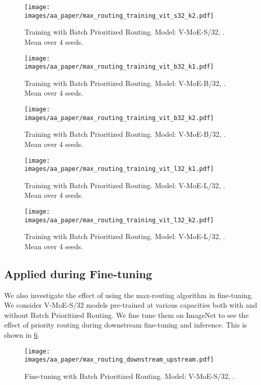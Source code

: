 \documentclass{article}
\newcommand{\abbv}{{V-MoE}}
\newcommand{\maxrouting}{Batch Prioritized Routing}
\begin{document}
\begin{figure}[h]
\centering
\texttt{[image: images/aa\_paper/max\_routing\_training\_vit\_s32\_k2.pdf]}
\caption{Training with \maxrouting{}. Model: \abbv{}-S/32, . Mean over 4 seeds.}
\label{im:training_max_routing_vit_s}
\end{figure}

\begin{figure}[h]
\centering
\texttt{[image: images/aa\_paper/max\_routing\_training\_vit\_b32\_k1.pdf]}
\caption{Training with \maxrouting{}. Model: \abbv{}-B/32, . Mean over 4 seeds.}
\label{im:training_max_routing_vit_b_k1}
\end{figure}


\begin{figure}[h]
\centering
\texttt{[image: images/aa\_paper/max\_routing\_training\_vit\_b32\_k2.pdf]}
\caption{Training with \maxrouting{}. Model: \abbv{}-B/32, . Mean over 4 seeds.}
\label{im:training_max_routing_vit_b}
\end{figure}


\begin{figure}[h]
\centering
\texttt{[image: images/aa\_paper/max\_routing\_training\_vit\_l32\_k1.pdf]}
\caption{Training with \maxrouting{}. Model: \abbv{}-L/32, . Mean over 4 seeds.}
\label{im:training_max_routing_vit_l_k1}
\end{figure}

\begin{figure}[h]
\centering
\texttt{[image: images/aa\_paper/max\_routing\_training\_vit\_l32\_k2.pdf]}
\caption{Training with \maxrouting{}. Model: \abbv{}-L/32, . Mean over 4 seeds.}
\label{im:training_max_routing_vit_l_k2}
\end{figure}

\clearpage

\subsection{Applied during Fine-tuning}
We also investigate the effect of using the max-routing algorithm in fine-tuning. We consider \abbv{}-S/32 models pre-trained at various capacities both with and without \maxrouting{}. We fine tune them on ImageNet to see the effect of priority routing during downstream fine-tuning and inference. This is shown in \cref{im:finetuning_max_routing}.

\begin{figure}[h]
\centering
\texttt{[image: images/aa\_paper/max\_routing\_downstream\_upstream.pdf]}
\caption{Fine-tuning with \maxrouting{}. Model: \abbv{}-S/32, .}
\label{im:finetuning_max_routing}
\end{figure}
\end{document}
